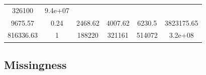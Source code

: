 \documentclass[]{book}
\theoremstyle{definition}
\theoremstyle{definition}
\theoremstyle{definition}
\theoremstyle{remark}
\begin{document}
\begin{longtable}[]{@{}cccccc@{}}
\begin{minipage}[t]{0.12\columnwidth}
326100\strut
\end{minipage} & \begin{minipage}[t]{0.14\columnwidth}\centering\strut
9.4e+07\strut
\end{minipage}\tabularnewline
\begin{minipage}[t]{0.14\columnwidth}\centering\strut
9675.57\strut
\end{minipage} & \begin{minipage}[t]{0.08\columnwidth}\centering\strut
0.24\strut
\end{minipage} & \begin{minipage}[t]{0.12\columnwidth}\centering\strut
2468.62\strut
\end{minipage} & \begin{minipage}[t]{0.12\columnwidth}\centering\strut
4007.62\strut
\end{minipage} & \begin{minipage}[t]{0.12\columnwidth}\centering\strut
6230.5\strut
\end{minipage} & \begin{minipage}[t]{0.14\columnwidth}\centering\strut
3823175.65\strut
\end{minipage}\tabularnewline
\begin{minipage}[t]{0.14\columnwidth}\centering\strut
816336.63\strut
\end{minipage} & \begin{minipage}[t]{0.08\columnwidth}\centering\strut
1\strut
\end{minipage} & \begin{minipage}[t]{0.12\columnwidth}\centering\strut
188220\strut
\end{minipage} & \begin{minipage}[t]{0.12\columnwidth}\centering\strut
321161\strut
\end{minipage} & \begin{minipage}[t]{0.12\columnwidth}\centering\strut
514072\strut
\end{minipage} & \begin{minipage}[t]{0.14\columnwidth}\centering\strut
3.2e+08\strut
\end{minipage}\tabularnewline
\bottomrule
\end{longtable}

\subsection{Missingness}\label{missingness}
\end{document}
